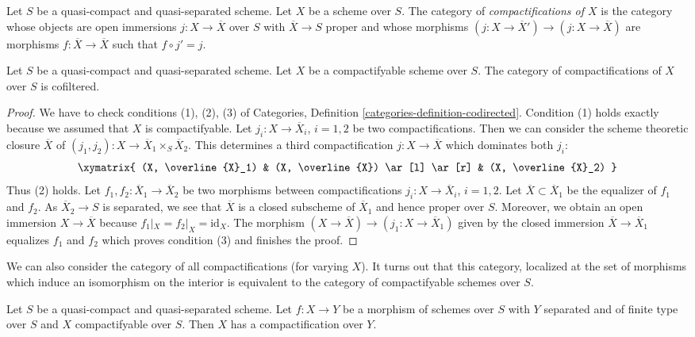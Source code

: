 \medskip\noindent
Let $S$ be a quasi-compact and quasi-separated scheme.
Let $X$ be a scheme over $S$. The category
of {\it compactifications of $X$} is the category whose
objects are open immersions $j : X \to \overline{X}$ over $S$ with
$\overline{X} \to S$ proper and whose morphisms
$(j : X \to \overline{X}') \to (j : X \to \overline{X})$
are morphisms $f : \overline{X} \to \overline{X}$ such that
$f \circ j' = j$.

\begin{lemma}
\label{lemma-compactifications-cofiltered}
Let $S$ be a quasi-compact and quasi-separated scheme.
Let $X$ be a compactifyable scheme over $S$.
The category of compactifications of $X$ over $S$ is
cofiltered.
\end{lemma}

\begin{proof}
We have to check conditions (1), (2), (3) of
Categories, Definition \ref{categories-definition-codirected}.
Condition (1) holds exactly because we assumed that $X$
is compactifyable.
Let $j_i : X \to \overline{X}_i$, $i = 1, 2$ be two compactifications.
Then we can consider the scheme theoretic closure $\overline{X}$
of $(j_1, j_2) : X \to \overline{X}_1 \times_S \overline{X}_2$.
This determines a third compactification $j : X \to \overline{X}$
which dominates both $j_i$:
$$
\xymatrix{
(X, \overline{X}_1) & (X, \overline{X}) \ar[l] \ar[r] & (X, \overline{X}_2)
}
$$
Thus (2) holds. Let $f_1, f_2 : \overline{X}_1 \to \overline{X}_2$
be two morphisms between compactifications
$j_i : X \to \overline{X}_i$, $i = 1, 2$.
Let $\overline{X} \subset \overline{X}_1$ be the equalizer of
$f_1$ and $f_2$. As $\overline{X}_2 \to S$ is separated, we see
that $\overline{X}$ is a closed subscheme of $\overline{X}_1$
and hence proper over $S$. Moreover, we obtain an
open immersion $X \to \overline{X}$ because $f_1|_X = f_2|_X = \text{id}_X$.
The morphism $(X \to \overline{X}) \to (j_1 : X \to \overline{X}_1)$
given by the closed immersion $\overline{X} \to \overline{X}_1$
equalizes $f_1$ and $f_2$ which proves condition (3) and
finishes the proof.
\end{proof}

\noindent
We can also consider the category of all compactifications (for varying $X$).
It turns out that this category, localized at the set of morphisms
which induce an isomorphism on the interior
is equivalent to the category of compactifyable schemes over $S$.

\begin{lemma}
\label{lemma-compactifyable}
Let $S$ be a quasi-compact and quasi-separated scheme. Let $f : X \to Y$
be a morphism of schemes over $S$ with $Y$ separated and of finite type
over $S$ and $X$ compactifyable over $S$. Then $X$ has a compactification
over $Y$.
\end{lemma}


